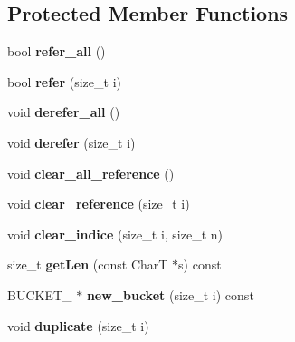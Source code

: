 \subsection*{Protected Member Functions}
\begin{CompactItemize}
\item 
\hypertarget{classbbt__string_f7c2c97517b7c20277eef1674df243ec}{
bool \textbf{refer\_\-all} ()}
\label{classbbt__string_f7c2c97517b7c20277eef1674df243ec}

\item 
\hypertarget{classbbt__string_13d26f2c0a420af8c2dd0e8816b7d580}{
bool \textbf{refer} (size\_\-t i)}
\label{classbbt__string_13d26f2c0a420af8c2dd0e8816b7d580}

\item 
\hypertarget{classbbt__string_3783c467d4626d8a98276c3c6244fdf3}{
void \textbf{derefer\_\-all} ()}
\label{classbbt__string_3783c467d4626d8a98276c3c6244fdf3}

\item 
\hypertarget{classbbt__string_c176cd583a8923d9eea441e51531aedc}{
void \textbf{derefer} (size\_\-t i)}
\label{classbbt__string_c176cd583a8923d9eea441e51531aedc}

\item 
\hypertarget{classbbt__string_058842ef552babd3da2c6034a78cdf32}{
void \textbf{clear\_\-all\_\-reference} ()}
\label{classbbt__string_058842ef552babd3da2c6034a78cdf32}

\item 
\hypertarget{classbbt__string_f984e7160a01c9264604bb05d7d1d6d1}{
void \textbf{clear\_\-reference} (size\_\-t i)}
\label{classbbt__string_f984e7160a01c9264604bb05d7d1d6d1}

\item 
\hypertarget{classbbt__string_461e10300db61e31743e9c5dad9acc30}{
void \textbf{clear\_\-indice} (size\_\-t i, size\_\-t n)}
\label{classbbt__string_461e10300db61e31743e9c5dad9acc30}

\item 
\hypertarget{classbbt__string_ec3984725d5acba737b35a86c830557c}{
size\_\-t \textbf{getLen} (const CharT $\ast$s) const }
\label{classbbt__string_ec3984725d5acba737b35a86c830557c}

\item 
\hypertarget{classbbt__string_a94c731e1b5f193b902efb470f90b811}{
BUCKET\_\- $\ast$ \textbf{new\_\-bucket} (size\_\-t i) const }
\label{classbbt__string_a94c731e1b5f193b902efb470f90b811}

\item 
\hypertarget{classbbt__string_4f3ee2c9657c4b817b763cd0fed7cdfd}{
void \textbf{duplicate} (size\_\-t i)}
\label{classbbt__string_4f3ee2c9657c4b817b763cd0fed7cdfd}


\end{CompactItemize}
